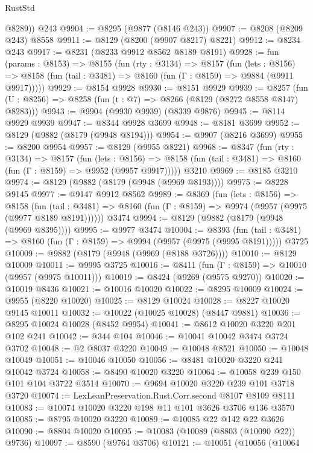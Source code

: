 \begin{lexlean}{RustStd}
\begin{coremodule}
        @8289))
    @243
@9904 := @8295 (@9877 (@8146 @243))
@9907 := @8208 (@8209 @243) @8558
@9911 := @8129 (@8200 (@9907 @8217) @8221)
@9912 := @8234 @243
@9917 := @8231 (@8233 @9912 @8562 @8189 @8191)
@9928 := fun (params : @8153) =>
  @8155
    (fun (rty : @3134) =>
    @8157
      (fun (lets : @8156) =>
      @8158 (fun (tail : @3481) => @8160 (fun (Γ : @8159) => @9884 (@9911 @9917)))))
@9929 := @8154 @9928
@9930 := @8151 @9929
@9939 := @8257 (fun (U : @8256) => @8258 (fun (t : @7) => @8266 (@8129 (@8272 @8558 @8147) @8283)))
@9943 := @9904 (@9930 @9939) (@8339 @9876)
@9945 := @8114 @9929 @9939
@9947 := @8344 @9928 @3699
@9948 := @8181 @3699
@9952 := @8129 (@9882 (@8179 (@9948 @8194)))
@9954 := @9907 (@8216 @3699)
@9955 := @8200 @9954
@9957 := @8129 (@9955 @8221)
@9968 := @8347
    (fun (rty : @3134) =>
    @8157
      (fun (lets : @8156) =>
      @8158 (fun (tail : @3481) => @8160 (fun (Γ : @8159) => @9952 (@9957 @9917)))))
    @3210
@9969 := @8185 @3210
@9974 := @8129 (@9882 (@8179 (@9948 (@9969 @8193))))
@9975 := @8228 @9145
@9977 := @9147 @9912 @8562
@9989 := @8369
    (fun (lets : @8156) =>
    @8158
      (fun (tail : @3481) => @8160 (fun (Γ : @8159) => @9974 (@9957 (@9975 (@9977 @8189 @8191))))))
    @3474
@9994 := @8129 (@9882 (@8179 (@9948 (@9969 @8395))))
@9995 := @9977 @3474
@10004 := @8393
    (fun (tail : @3481) => @8160 (fun (Γ : @8159) => @9994 (@9957 (@9975 (@9995 @8191)))))
    @3725
@10009 := @9882 (@8179 (@9948 (@9969 (@8188 @3726))))
@10010 := @8129 @10009
@10011 := @9995 @3725
@10016 := @8411 (fun (Γ : @8159) => @10010 (@9957 (@9975 @10011)))
@10019 := @8424 (@9269 (@9575 @9270))
@10020 := @10019 @8436
@10021 := @10016 @10020
@10022 := @8295 @10009
@10024 := @9955 (@8220 @10020)
@10025 := @8129 @10024
@10028 := @8227 @10020 @9145 @10011
@10032 := @10022 (@10025 @10028) (@8447 @9881)
@10036 := @8295 @10024 @10028 (@8452 @9954)
@10041 := @8612 @10020 @3220 @201 @102 @241
@10042 := @344 @104
@10046 := @10041 @10042 @3474 @3724 @3702
@10048 := @2 @8037 @3220
@10049 := @10048 @8521
@10050 := @10048 @10049
@10051 := @10046 @10050
@10056 := @8481 @10020 @3220 @241 @10042 @3724
@10058 := @8490 @10020 @3220
@10064 := @10058 @239 @150 @101 @104 @3722 @3514
@10070 := @9694 @10020 @3220 @239 @101 @3718 @3720
@10074 := LexLeanPreservation.Rust.Corr.second @8107 @8109 @8111
@10083 := @10074 @10020 @3220 @198 @11 @101 @3626 @3706 @136 @3570
@10085 := @8795 @10020 @3220
@10089 := @10085 @22 @142 @22 @3626
@10090 := @8804 @10020
@10095 := @10083 (@10089 (@8803 (@10090 @22)) @9736)
@10097 := @8590 (@9764 @3706)
@10121 := @10051
    (@10056
      (@10064

\end{coremodule}
\end{lexlean}
